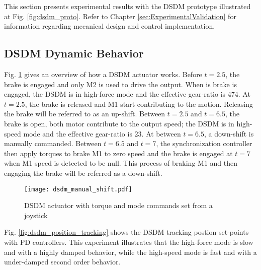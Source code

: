 This section presents experimental results with the DSDM prototype illustrated at Fig. \ref{fig:dsdm_proto}. Refer to Chapter \ref{sec:ExperimentalValidation} for information regarding mecanical design and control implementation.

\subsection{DSDM Dynamic Behavior}

%

Fig. \ref{fig:dsdm_manual_shift} gives an overview of how a DSDM actuator works. Before $t=2.5$, the brake is engaged and only M2 is used to drive the output. When is brake is engaged, the DSDM is in high-force mode and the effective gear-ratio is 474. At $t=2.5$, the brake is released and M1 start contributing to the motion. Releasing the brake will be referred to as an up-shift. Between $t=2.5$ and $t=6.5$, the brake is open, both motor contribute to the output speed; the DSDM is in high-speed mode and the effective gear-ratio is 23. At between $t=6.5$, a down-shift is manually commanded. Between $t=6.5$ and $t=7$, the synchronization controller then apply torques to brake M1 to zero speed and the brake is engaged at $t=7$ when M1 speed is detected to be null. This process of braking M1 and then engaging the brake will be referred as a down-shift.

\begin{figure}[htp]
	\centering
		\texttt{[image: dsdm\_manual\_shift.pdf]}
	\caption[DSDM behavior overview]{DSDM actuator with torque and mode commands set from a joystick}
	\label{fig:dsdm_manual_shift}
\end{figure}

Fig. \ref{fig:dsdm_position_tracking} shows the DSDM tracking postion set-points with PD controllers. This experiment illustrates that the high-force mode is slow and with a highly damped behavior, while the high-speed mode is fast and with a under-damped second order behavior. 

